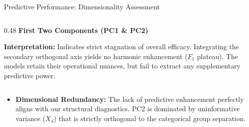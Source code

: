 \documentclass[8pt, aspectratio=169]{beamer}
\begin{document}
\begin{frame}{Predictive Performance: Dimensionality Assessment}
\begin{columns}[T]
        \begin{column}{0.48\textwidth}
            \centering
            \textbf{First Two Components (PC1 \& PC2)}
            \vspace{0.1cm}
            \begin{table}
            \end{table}
            \vspace{0.1cm}
            \justifying
            \scriptsize{\textbf{Interpretation:} Indicates strict stagnation of overall efficacy. Integrating the secondary orthogonal axis yields no harmonic enhancement ($F_1$ plateau). The models retain their operational nuances, but fail to extract any supplementary predictive power.}
        \end{column}
    \end{columns}

    \vspace{0.4cm}
    \begin{itemize}
        \item \textbf{Dimensional Redundancy:} The lack of predictive enhancement perfectly aligns with our structural diagnostics. PC2 is dominated by uninformative variance ($X_4$) that is strictly orthogonal to the categorical group separation.
        
    \end{itemize}
\end{frame}
\end{document}
